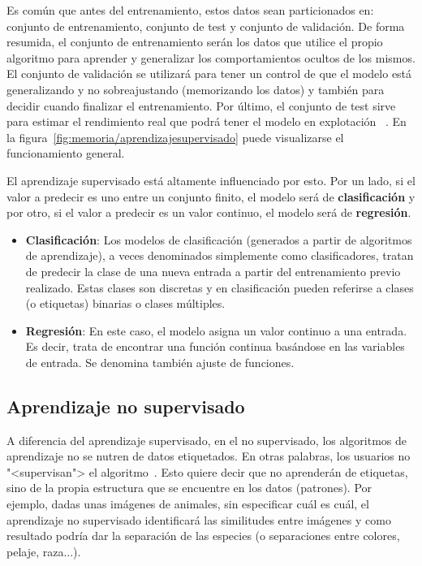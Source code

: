 Es común que antes del entrenamiento, estos datos sean particionados en:
conjunto de entrenamiento, conjunto de test y conjunto de validación. De forma
resumida, el conjunto de entrenamiento serán los datos que utilice el propio
algoritmo para aprender y generalizar los comportamientos ocultos de los mismos.
El conjunto de validación se utilizará para tener un control de que el modelo
está generalizando y no sobreajustando (memorizando los datos) y también para
decidir cuando finalizar el entrenamiento. Por último, el conjunto de test sirve
para estimar el rendimiento real que podrá tener el modelo en explotación
~\cite{enwiki:conjuntos}. En la figura~\ref{fig:memoria/aprendizajesupervisado}
puede visualizarse el funcionamiento general.


El aprendizaje supervisado está altamente influenciado por esto. Por un lado, si
el valor a predecir es uno entre un conjunto finito, el modelo será de
\textbf{clasificación} y por otro, si el valor a predecir es un valor continuo,
el modelo será de \textbf{regresión}.

\begin{itemize}
    \item \textbf{Clasificación}: Los modelos de clasificación (generados a
    partir de algoritmos de aprendizaje), a veces denominados simplemente como
    clasificadores, tratan de predecir la clase de una nueva entrada a partir
    del entrenamiento previo realizado. Estas clases son discretas y en
    clasificación pueden referirse a clases (o etiquetas) binarias o clases
    múltiples.
    
    \item \textbf{Regresión}: En este caso, el modelo asigna un valor continuo a
    una entrada. Es decir, trata de encontrar una función continua basándose en
    las variables de entrada. Se denomina también ajuste de funciones.
\end{itemize}

\clearpage

\subsection{Aprendizaje no supervisado}

A diferencia del aprendizaje supervisado, en el no supervisado, los algoritmos
de aprendizaje no se nutren de datos etiquetados. En otras palabras, los
usuarios no "<supervisan"> el algoritmo~\cite{salim:usl}. Esto quiere decir que
no aprenderán de etiquetas, sino de la propia estructura que se encuentre en los
datos (patrones). Por ejemplo, dadas unas imágenes de animales, sin especificar
cuál es cuál, el aprendizaje no supervisado identificará las similitudes entre
imágenes y como resultado podría dar la separación de las especies (o
separaciones entre colores, pelaje, raza...).

